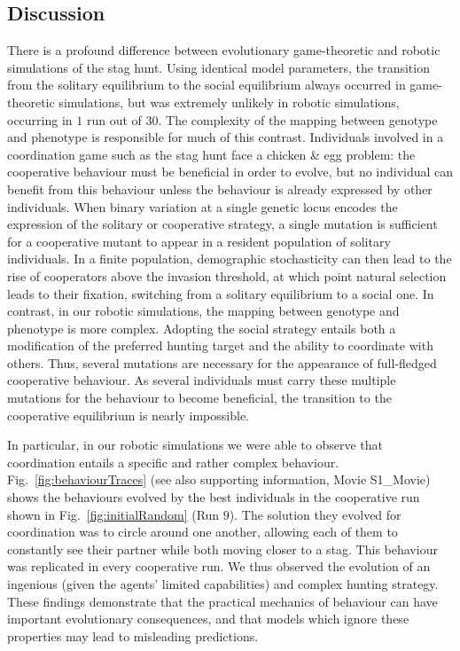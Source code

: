   \subsection{Discussion}
  \label{discussion}
    There is a profound difference between evolutionary game-theoretic and robotic simulations of the stag hunt. Using identical model parameters, the transition from the solitary equilibrium to the social equilibrium always occurred in game-theoretic simulations, but was extremely unlikely in robotic simulations, occurring in $1$ run out of $30$. The complexity of the mapping between genotype and phenotype is responsible for much of this contrast. Individuals involved in a coordination game such as the stag hunt face a chicken \& egg problem: the cooperative behaviour must be beneficial in order to evolve, but no individual can benefit from this behaviour unless the behaviour is already expressed by other individuals. When binary variation at a single genetic locus encodes the expression of the solitary or cooperative strategy, a single mutation is sufficient for a cooperative mutant to appear in a resident population of solitary individuals. In a finite population, demographic stochasticity can then lead to the rise of cooperators above the invasion threshold, at which point natural selection leads to their fixation, switching from a solitary equilibrium to a social one. In contrast, in our robotic simulations, the mapping between genotype and phenotype is more complex. Adopting the social strategy entails both a modification of the preferred hunting target and the ability to coordinate with others. Thus, several mutations are necessary for the appearance of full-fledged cooperative behaviour. As several individuals must carry these multiple mutations for the behaviour to become beneficial, the transition to the cooperative equilibrium is nearly impossible.

    In particular, in our robotic simulations we were able to observe that coordination entails a specific and rather complex behaviour. Fig.~\ref{fig:behaviourTraces} (see also supporting information, Movie S1\_Movie) shows the behaviours evolved by the best individuals in the cooperative run shown in Fig.~\ref{fig:initialRandom} (Run $9$). The solution they evolved for coordination was to circle around one another, allowing each of them to constantly see their partner while both moving closer to a stag. This behaviour was replicated in every cooperative run. We thus observed the evolution of an ingenious (given the agents' limited capabilities) and complex hunting strategy. These findings demonstrate that the practical mechanics of behaviour can have important evolutionary consequences, and that models which ignore these properties may lead to misleading predictions.

